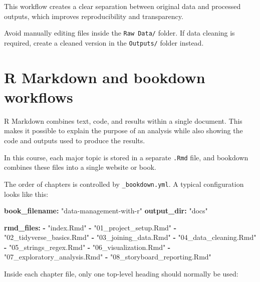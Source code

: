 \documentclass[
  11pt,
  oneside]{book}
\newenvironment{Shaded}{\begin{snugshade}}{\end{snugshade}}
\newcommand{\AttributeTok}[1]{\textcolor[rgb]{0.13,0.29,0.53}{#1}}
\newcommand{\FunctionTok}[1]{\textcolor[rgb]{0.13,0.29,0.53}{\textbf{#1}}}
\newcommand{\KeywordTok}[1]{\textcolor[rgb]{0.13,0.29,0.53}{\textbf{#1}}}
\newcommand{\StringTok}[1]{\textcolor[rgb]{0.31,0.60,0.02}{#1}}
\begin{document}
This workflow creates a clear separation between original data and processed outputs, which improves reproducibility and transparency.

Avoid manually editing files inside the \texttt{Raw\ Data/} folder. If data cleaning is required, create a cleaned version in the \texttt{Outputs/} folder instead.

\section{R Markdown and bookdown workflows}\label{r-markdown-and-bookdown-workflows}

R Markdown combines text, code, and results within a single document. This makes it possible to explain the purpose of an analysis while also showing the code and outputs used to produce the results.

In this course, each major topic is stored in a separate \texttt{.Rmd} file, and bookdown combines these files into a single website or book.

The order of chapters is controlled by \texttt{\_bookdown.yml}. A typical configuration looks like this:

\begin{Shaded}
\begin{Highlighting}[]
\FunctionTok{book\_filename}\KeywordTok{:}\AttributeTok{ }\StringTok{"data{-}management{-}with{-}r"}
\FunctionTok{output\_dir}\KeywordTok{:}\AttributeTok{ }\StringTok{"docs"}

\FunctionTok{rmd\_files}\KeywordTok{:}
\AttributeTok{  }\KeywordTok{{-}}\AttributeTok{ }\StringTok{"index.Rmd"}
\AttributeTok{  }\KeywordTok{{-}}\AttributeTok{ }\StringTok{"01\_project\_setup.Rmd"}
\AttributeTok{  }\KeywordTok{{-}}\AttributeTok{ }\StringTok{"02\_tidyverse\_basics.Rmd"}
\AttributeTok{  }\KeywordTok{{-}}\AttributeTok{ }\StringTok{"03\_joining\_data.Rmd"}
\AttributeTok{  }\KeywordTok{{-}}\AttributeTok{ }\StringTok{"04\_data\_cleaning.Rmd"}
\AttributeTok{  }\KeywordTok{{-}}\AttributeTok{ }\StringTok{"05\_strings\_regex.Rmd"}
\AttributeTok{  }\KeywordTok{{-}}\AttributeTok{ }\StringTok{"06\_visualization.Rmd"}
\AttributeTok{  }\KeywordTok{{-}}\AttributeTok{ }\StringTok{"07\_exploratory\_analysis.Rmd"}
\AttributeTok{  }\KeywordTok{{-}}\AttributeTok{ }\StringTok{"08\_storyboard\_reporting.Rmd"}
\end{Highlighting}
\end{Shaded}

Inside each chapter file, only one top-level heading should normally be used:
\end{document}

